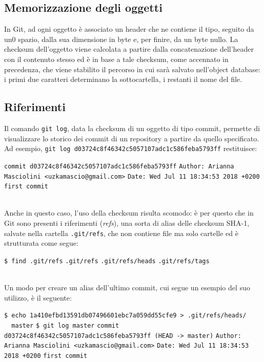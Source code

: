 \documentclass[12pt]{article}
\def\code#1{\texttt{#1}}
\begin{document}
\subsection{Memorizzazione degli oggetti}
In Git, ad ogni oggetto è associato un header che ne contiene il tipo, seguito da un0 spazio, dalla sua dimensione in byte e, per finire, da un byte nullo. La checksum dell'oggetto viene calcolata a partire dalla concatenazione dell'header con il contenuto stesso ed è in base a tale checksum, come accennato in precedenza, che viene stabilito il percorso in cui sarà salvato nell'object database: i primi due caratteri determinano la sottocartella, i restanti il nome del file.
\subsection{Riferimenti}
Il comando \code{git log}, data la checksum di un oggetto di tipo commit, permette di visualizzare lo storico dei commit di un repository a partire da quello specificato. Ad esempio, \code{git log d03724c8f46342c5057107adc1c586feba5793ff} restituisce:
\begin{algorithm*}
	\begin{algorithmic}
		\State \code{commit d03724c8f46342c5057107adc1c586feba5793ff}
		\State \code{Author: Arianna Masciolini <uzkamascio@gmail.com>}
		\State \code{Date:   Wed Jul 11 18:34:53 2018 +0200}
		\State 
		\State \code{first commit}
	\end{algorithmic}
\end{algorithm*}
\ \\
Anche in questo caso, l'uso della checksum risulta scomodo: è per questo che in Git sono presenti i riferimenti (\textit{refs}), una sorta di alias delle checksum SHA-1, salvate nella cartella \code{.git/refs}, che non contiene file ma solo cartelle ed è strutturata come segue:
\begin{algorithm*}
	\begin{algorithmic}
		\State \code{\$ find .git/refs}
		\State \code{.git/refs}
		\State \code{.git/refs/heads}
		\State \code{.git/refs/tags}
	\end{algorithmic}
\end{algorithm*}
\ \\Un modo per creare un alias dell'ultimo commit, cui segue un esempio del suo utilizzo, è il seguente:
\begin{algorithm*}
	\begin{algorithmic}
		\State \code{\$ echo 1a410efbd13591db07496601ebc7a059dd55cfe9 > .git/refs/heads/\\ \ \ master}
		\State \code{\$ git log master}
		\State \code{commit d03724c8f46342c5057107adc1c586feba5793ff (HEAD -> master)}
		\State \code{Author: Arianna Masciolini <uzkamascio@gmail.com>}
		\State \code{Date:   Wed Jul 11 18:34:53 2018 +0200}
		\State
		\State \code{first commit}
	\end{algorithmic}
\end{algorithm*}
\end{document}
